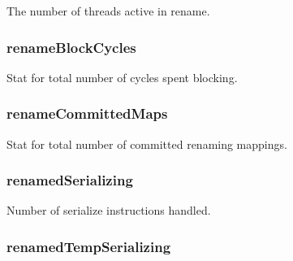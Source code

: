 \label{classDefaultRename_a88377f855dbf5adeeecb06b5bb821d35}
The number of threads active in rename. \hypertarget{classDefaultRename_a45732215f002b5052d042ef5798735f0}{
\subsubsection[{renameBlockCycles}]{ {\bf renameBlockCycles}}}
\label{classDefaultRename_a45732215f002b5052d042ef5798735f0}
Stat for total number of cycles spent blocking. \hypertarget{classDefaultRename_a5d4c3559dbd988f18cc6d1c0e0470fcb}{
\subsubsection[{renameCommittedMaps}]{ {\bf renameCommittedMaps}}}
\label{classDefaultRename_a5d4c3559dbd988f18cc6d1c0e0470fcb}
Stat for total number of committed renaming mappings. \hypertarget{classDefaultRename_a6e383a41c8a2b8902dd659805c40621e}{
\subsubsection[{renamedSerializing}]{ {\bf renamedSerializing}}}
\label{classDefaultRename_a6e383a41c8a2b8902dd659805c40621e}
Number of serialize instructions handled. \hypertarget{classDefaultRename_a94f16020be7d9c91aa978ce88f0adb1b}{
\subsubsection[{renamedTempSerializing}]{ {\bf renamedTempSerializing}}}
